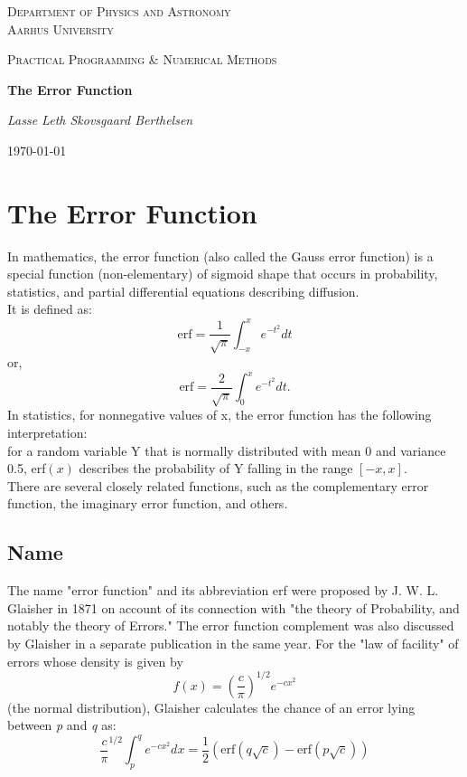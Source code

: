 \documentclass[12pt, a4paper, oneside]{article}
\begin{document}
	\begin{titlepage}
	\centering
	{\scshape\Large Department of Physics and Astronomy \\ \LARGE Aarhus University \par}
	\vspace{1cm}
	{\scshape\Large Practical Programming \& Numerical Methods \par}
	\vspace{0.5cm}
	{\huge\bfseries The Error Function \par}
	\vspace{1cm}
	{\Large\itshape Lasse Leth Skovsgaard Berthelsen \par}
	\vfill
	{\large \today \par}
	\end{titlepage}
\newpage
\section*{The Error Function}
In mathematics, the error function (also called the Gauss error function) 
is a special function (non-elementary) of sigmoid shape that occurs in probability, 
statistics, and partial differential equations describing diffusion. \\
\noindent 
It is defined as:
\begin{equation}
\mbox{erf}=\frac{1}{\sqrt{\pi}}\int_{-x}^{x} e^{-t^2}dt
\end{equation}
or,
\begin{equation}
\mbox{erf}=\frac{2}{\sqrt{\pi}}\int_{0}^{x} e^{-t^2}dt.
\end{equation}
\break \noindent
In statistics, for nonnegative values of x, the error function has the following interpretation: \\
for a random variable Y that is normally distributed with mean 0 and variance 0.5, 
erf$(x)$ describes the probability of Y falling in the range $[-x, x]$.\\
\noindent
There are several closely related functions, such as the complementary error function, the imaginary error function, and others. 

\subsection*{Name}
The name "error function" and its abbreviation erf were proposed by J. W. L. Glaisher in 1871 on account of its connection with "the theory of Probability, and notably the theory of Errors." The error function complement was also discussed by Glaisher in a separate publication in the same year. For the "law of facility" of errors whose density is given by
\begin{equation}
f(x) = \left(\frac{c}{\pi}\right)^{1/2}e^{-cx^2}
\end{equation} 
(the normal distribution), Glaisher calculates the chance of an error lying between \textit{p} and \textit{q} as:
\begin{equation}
\frac{c}{\pi}^{1/2} \int_p ^q e^{-cx^2} dx = \frac{1}{2}\left(\mbox{erf}\left(q\sqrt{c}\right)-\mbox{erf}\left(p\sqrt{c}\right)\right)
\end{equation}
\end{document}
